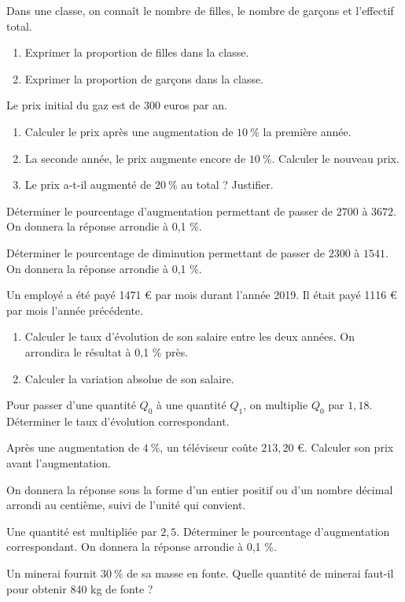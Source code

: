 


\exo
Dans une classe, on connaît le nombre de filles, le nombre de garçons et l'effectif total.
\begin{enumerate}
\item Exprimer la proportion de filles dans la classe.
\item Exprimer la proportion de garçons dans la classe.
\end{enumerate}

\exo
Le prix initial du gaz est de 300 euros par an.
\begin{enumerate}
\item Calculer le prix après une augmentation de $10~\%$ la première année.
\item La seconde année, le prix augmente encore de $10~\%$. Calculer le nouveau prix.
\item Le prix a-t-il augmenté de $20~\%$ au total ? Justifier.
\end{enumerate}


\exo
Déterminer le pourcentage d'augmentation permettant de passer de $2700$ à $3672$.
On donnera la réponse arrondie à 0,1 \%.

\exo
Déterminer le pourcentage de diminution permettant de passer de $2300$ à $1541$.
On donnera la réponse arrondie à 0,1 \%.

\exo
Un employé a été payé 1471 \euro{} par mois durant l'année 2019.
Il était payé 1116 \euro{} par mois l'année précédente.
\begin{enumerate}
\item Calculer le taux d'évolution de son salaire entre les deux années.
On arrondira le résultat à 0,1 \% près.
\item Calculer la variation absolue de son salaire.
\end{enumerate}


\exo
Pour passer d'une quantité $Q_0$ à une quantité $Q_1$, on multiplie $Q_0$ par $1,18$.
Déterminer le taux d'évolution correspondant.

\exo
Après une augmentation de $4~\%$, un téléviseur coûte $213,20$ \euro{}.
Calculer son prix avant l'augmentation.

On donnera la réponse sous la forme d'un entier positif ou d'un nombre décimal arrondi au centième, suivi de l'unité qui convient.

\exo
Une quantité est multipliée par $2,5$. Déterminer le pourcentage d'augmentation correspondant.
On donnera la réponse arrondie à 0,1 \%.

\exo
Un minerai fournit $30~\%$ de sa masse en fonte.
Quelle quantité de minerai faut-il pour obtenir 840 kg de fonte ?

